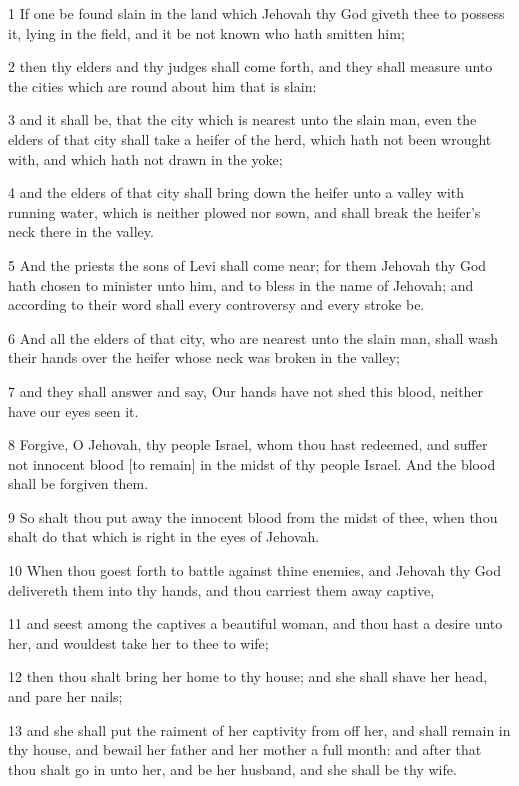 \par 1 If one be found slain in the land which Jehovah thy God giveth thee to possess it, lying in the field, and it be not known who hath smitten him;
\par 2 then thy elders and thy judges shall come forth, and they shall measure unto the cities which are round about him that is slain:
\par 3 and it shall be, that the city which is nearest unto the slain man, even the elders of that city shall take a heifer of the herd, which hath not been wrought with, and which hath not drawn in the yoke;
\par 4 and the elders of that city shall bring down the heifer unto a valley with running water, which is neither plowed nor sown, and shall break the heifer's neck there in the valley.
\par 5 And the priests the sons of Levi shall come near; for them Jehovah thy God hath chosen to minister unto him, and to bless in the name of Jehovah; and according to their word shall every controversy and every stroke be.
\par 6 And all the elders of that city, who are nearest unto the slain man, shall wash their hands over the heifer whose neck was broken in the valley;
\par 7 and they shall answer and say, Our hands have not shed this blood, neither have our eyes seen it.
\par 8 Forgive, O Jehovah, thy people Israel, whom thou hast redeemed, and suffer not innocent blood [to remain] in the midst of thy people Israel. And the blood shall be forgiven them.
\par 9 So shalt thou put away the innocent blood from the midst of thee, when thou shalt do that which is right in the eyes of Jehovah.
\par 10 When thou goest forth to battle against thine enemies, and Jehovah thy God delivereth them into thy hands, and thou carriest them away captive,
\par 11 and seest among the captives a beautiful woman, and thou hast a desire unto her, and wouldest take her to thee to wife;
\par 12 then thou shalt bring her home to thy house; and she shall shave her head, and pare her nails;
\par 13 and she shall put the raiment of her captivity from off her, and shall remain in thy house, and bewail her father and her mother a full month: and after that thou shalt go in unto her, and be her husband, and she shall be thy wife.
